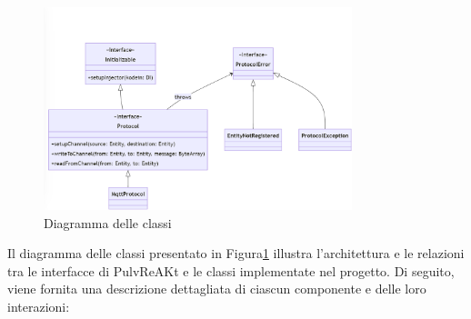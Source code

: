\documentclass[12pt,a4paper,openright,twoside]{book}
\begin{document}
\begin{figure}[h]
    \centering
    \includegraphics[width=0.8\textwidth]{figures/class-diagram.png}
    \caption{Diagramma delle classi}
    \label{fig:class-diagram}
\end{figure}

Il diagramma delle classi presentato in Figura\ref{fig:class-diagram} illustra l'architettura e le relazioni tra le interfacce di PulvReAKt e le classi implementate nel progetto. 
Di seguito, viene fornita una descrizione dettagliata di ciascun componente e delle loro interazioni:
\end{document}
